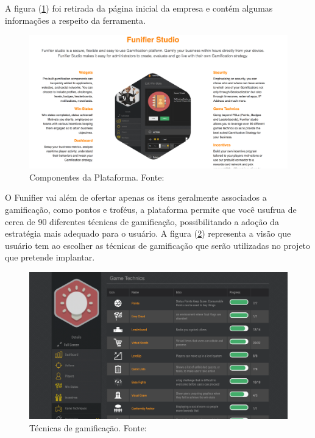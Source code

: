 \newpage 
A figura (\ref{funifier}) foi retirada da página inicial da empresa e contém algumas informações a respeito da ferramenta.


\begin{figure}[h]
	\centering
		\includegraphics[keepaspectratio=true,scale=0.3]{figuras/funifier.png}
	\caption{Componentes da Plataforma. Fonte: \cite{funifier}\label{funifier}
}
\end{figure}


O Funifier vai além de ofertar apenas os itens geralmente associados a gamificação, como pontos e troféus, a plataforma permite que você usufrua de cerca de 90 diferentes técnicas de gamificação, possibilitando a adoção da estratégia mais adequado para o usuário. A figura (\ref{tecnicas}) representa a visão que usuário tem ao escolher as técnicas de gamificação que serão utilizadas no projeto que pretende implantar.



\begin{figure}[h]
	\centering
		\includegraphics[keepaspectratio=true,scale=0.3]{figuras/tecniques.png}
	\caption{Técnicas de gamificação. Fonte: \cite{funifier}\label{tecnicas}
}
\end{figure}


